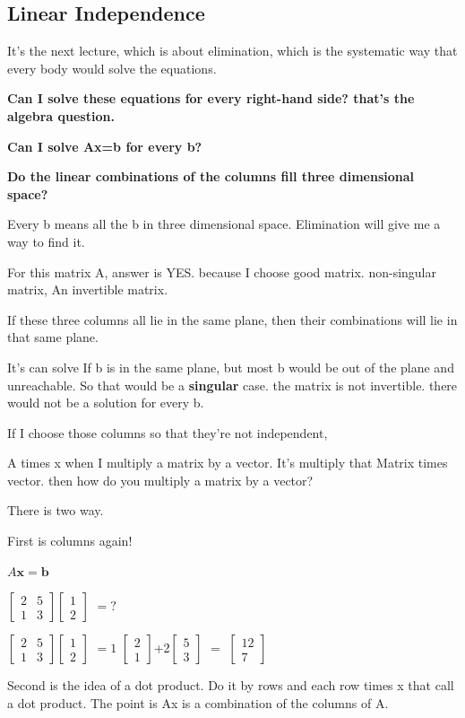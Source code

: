 \documentclass{article}
\begin{document}
\subsection{Linear Independence}
It's the next lecture, which is about elimination, which is the systematic way that every body would solve the equations.


\textbf{Can I solve these equations for every right-hand side? that's the algebra question.}

\textbf{Can I solve Ax=b for every b?}

\textbf{Do the linear combinations of the columns fill three dimensional space?}

Every b means all the b in three dimensional space. Elimination will give me a way to find it.




For this matrix A, answer is YES. because I choose good matrix. non-singular matrix, An invertible matrix.

If these three columns all lie in the same plane, then their combinations will lie in that same plane.

It's can solve If b is in the same plane, but most b would be out of the plane and unreachable. So that would be a \textbf{singular} case. the matrix is not invertible. there would not be a solution for every b.

If I choose those columns so that they're not independent,


A times x when I multiply a matrix by a vector. It's multiply that Matrix times vector. then how do you multiply a matrix by a vector?

There is two way.

First is columns again!

\begin{center}


$A\textbf{x}=\textbf{b}$

$\begin{bmatrix}
2 & 5 \\
1 & 3 
\end{bmatrix}
\begin{bmatrix}
1\\
2
\end{bmatrix}$
$=?$


$\begin{bmatrix}
2 & 5 \\
1 & 3 
\end{bmatrix}
\begin{bmatrix}
1\\
2
\end{bmatrix}$
$= 1$
$\begin{bmatrix}
2 \\
1  
\end{bmatrix}
$+2$
\begin{bmatrix}
5\\
3
\end{bmatrix}$
$=$
$\begin{bmatrix}
12\\
7
\end{bmatrix}$

\end{center}

Second is the idea of a dot product. Do it by rows and each row times x that call a dot product. The point is Ax is a combination of the columns of A.
\end{document}
